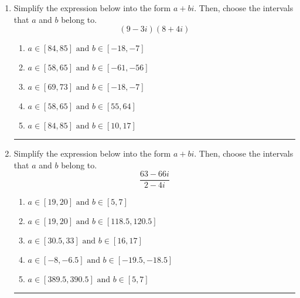 \documentclass[14pt]{extbook}
\newcommand{\litem}[1]{\item#1\hspace*{-1cm}\rule{\textwidth}{0.4pt}}
\begin{document}
\begin{enumerate}
{\begin{enumerate}[label=\Alph*.]
\end{enumerate} }
\litem{
Simplify the expression below into the form $a+bi$. Then, choose the intervals that $a$ and $b$ belong to.\[ (9 - 3 i)(8 + 4 i) \]\begin{enumerate}[label=\Alph*.]
\item \( a \in [84, 85] \text{ and } b \in [-18, -7] \)
\item \( a \in [58, 65] \text{ and } b \in [-61, -56] \)
\item \( a \in [69, 73] \text{ and } b \in [-18, -7] \)
\item \( a \in [58, 65] \text{ and } b \in [55, 64] \)
\item \( a \in [84, 85] \text{ and } b \in [10, 17] \)

\end{enumerate} }
\litem{
Simplify the expression below into the form $a+bi$. Then, choose the intervals that $a$ and $b$ belong to.\[ \frac{63 - 66 i}{2 - 4 i} \]\begin{enumerate}[label=\Alph*.]
\item \( a \in [19, 20] \text{ and } b \in [5, 7] \)
\item \( a \in [19, 20] \text{ and } b \in [118.5, 120.5] \)
\item \( a \in [30.5, 33] \text{ and } b \in [16, 17] \)
\item \( a \in [-8, -6.5] \text{ and } b \in [-19.5, -18.5] \)
\item \( a \in [389.5, 390.5] \text{ and } b \in [5, 7] \)

\end{enumerate} }
\end{enumerate}
\end{document}
